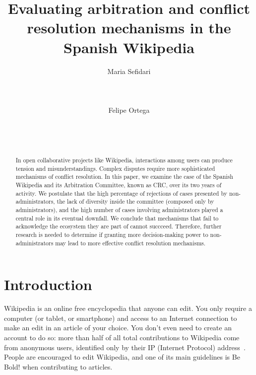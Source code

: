 \documentclass{sigchi}
\begin{document}
\title{Evaluating arbitration and conflict resolution mechanisms in the Spanish Wikipedia}

\author{
  \alignauthor Maria Sefidari\\
    \\
    \\
    \\
  \alignauthor Felipe Ortega\\
    \\
    \\
    \\  
}

\maketitle

\begin{abstract}
In open collaborative projects like Wikipedia, interactions among users can produce tension and
misunderstandings. Complex disputes require more sophisticated mechanisms of conflict resolution.
In this paper, we examine the case of the Spanish Wikipedia and its Arbitration Committee, 
known as CRC, over its two years of activity. We postulate that the high percentage of 
rejections of cases presented by non-administrators, the lack of diversity inside the 
committee (composed only by administrators), and the high number of cases involving administrators 
played a central role in its eventual downfall. We conclude that mechanisms that fail to
acknowledge the ecosystem they are part of cannot succceed. Therefore, further research is 
needed to determine if granting more decision-making power to non-administrators may lead 
to more effective conflict resolution mechanisms.
\end{abstract}



\section{Introduction}

Wikipedia is an online free encyclopedia that anyone can edit. You only require a 
computer (or tablet, or smartphone) and access to an Internet connection to make an 
edit in an article of your choice. You don’t even need to create an account to do so: 
more than half of all total contributions to Wikipedia come from anonymous users, identified 
only by their IP (Internet Protocol) address~\cite{rfc791}. People are encouraged to edit Wikipedia, 
and one of its main guidelines is Be Bold! when contributing to articles.
\end{document}
